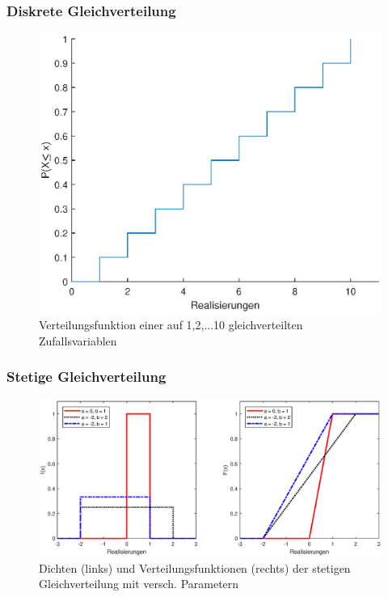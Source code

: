 \begin{frame}
\frametitle{Diskrete Gleichverteilung}
\begin{figure}[hbtp]
\centering
\includegraphics[scale = 0.5]{images/plot_discrete_uniform.eps}
\caption{Verteilungsfunktion einer auf {1,2,...10} gleichverteilten Zufallsvariablen}
\end{figure}
\end{frame}

\begin{frame}
\frametitle{Stetige Gleichverteilung}
\begin{figure}[hbtp]
\centering
\includegraphics[scale=0.5]{images/plot_con_uniform.eps}
\caption{Dichten (links) und Verteilungsfunktionen (rechts) der stetigen Gleichverteilung mit versch. Parametern}
\end{figure}
\end{frame}

